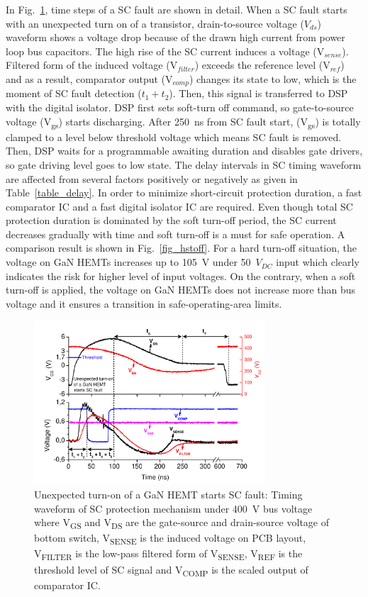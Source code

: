 \documentclass[journal]{IEEEtran}
\begin{document}
In Fig.~\ref{fig_timing}, time steps of a SC fault are shown in detail. When a SC fault starts with an unexpected turn on of a transistor, drain-to-source voltage ($V_{ds}$) waveform shows a voltage drop because of the drawn high current from power loop bus capacitors. The high rise of the SC current induces a voltage (V$_{sense}$).  Filtered form of the induced voltage (V$_{filter}$) exceeds the reference level (V$_{ref}$) and as a result, comparator output (V$_{comp}$) changes its state to low, which is the moment of SC fault detection ($t_1 + t_2$). Then, this signal is transferred to DSP with the digital isolator. DSP first sets soft-turn off command, so gate-to-source voltage (V\textsubscript{gs}) starts discharging. After 250~ns from SC fault start, (V\textsubscript{gs}) is totally clamped to a level below threshold voltage which means SC fault is removed. Then, DSP waits for a programmable awaiting duration and disables gate drivers, so gate driving level goes to low state. The delay intervals in SC timing waveform are affected from several factors positively or negatively as given in Table~\ref{table_delay}. In order to minimize short-circuit protection duration, a fast comparator IC and a fast digital isolator IC are required. Even though total SC protection duration is dominated by the soft turn-off period, the SC current decreases gradually with time and soft turn-off is a must for safe operation. A comparison result is shown in Fig.~\ref{fig_hstoff}. For a hard turn-off situation, the voltage on GaN HEMTs increases up to 105~V under 50~$V_{DC}$ input which clearly indicates the risk for higher level of input voltages. On the contrary, when a soft turn-off is applied, the voltage on GaN HEMTs does not increase more than bus voltage and it ensures a transition in safe-operating-area limits.

\begin{figure}[]
\centering
\includegraphics[width=3.4in]{Figures/Fig12-SCTiming.pdf}
\caption{Unexpected turn-on of a GaN HEMT starts SC fault: Timing waveform of SC protection mechanism under 400~V bus voltage where V\textsubscript{GS} and V\textsubscript{DS} are the gate-source and drain-source voltage of bottom switch, V\textsubscript{SENSE} is the induced voltage on PCB layout, V\textsubscript{FILTER} is the low-pass filtered form of V\textsubscript{SENSE},  V\textsubscript{REF} is the threshold level of SC signal and V\textsubscript{COMP} is the scaled output of comparator IC.}
\label{fig_timing}
\end{figure}
\end{document}
